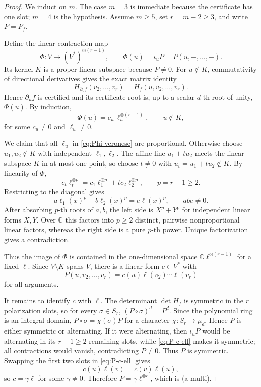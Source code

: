 \documentclass[11pt]{amsart}
\newcommand{\C}{\mathbb C}
\begin{document}
\begin{proof}
We induct on $m$.  The case $m=3$ is immediate because the certificate has one
slot; $m=4$ is the hypothesis.  Assume $m\ge5$, set $r=m-2\ge3$, and write
$P=P_f$.

Define the linear contraction map
\[
 \Phi:V\longrightarrow(V^*)^{\otimes(r-1)},\qquad
 \Phi(u)=\iota_uP=P(u,-,\ldots,-).
\]
Its kernel $K$ is a proper linear subspace because $P\neq0$.  For
$u\notin K$, commutativity of directional derivatives gives the exact matrix
identity
\[
 H_{\partial_u f}(v_2,\ldots,v_r)=H_f(u,v_2,\ldots,v_r).
\]
Hence $\partial_u f$ is certified and its certificate root is, up to a scalar
$d$-th root of unity, $\Phi(u)$.  By induction,
\begin{equation}\label{eq:Phi-veronese}
 \Phi(u)=c_u\,\ell_u^{\otimes(r-1)},\qquad u\notin K,
\end{equation}
for some $c_u\neq0$ and $\ell_u\neq0$.

We claim that all $\ell_u$ in \eqref{eq:Phi-veronese} are proportional.
Otherwise choose $u_1,u_2\notin K$ with independent $\ell_1,\ell_2$.
The affine line $u_1+t u_2$ meets the linear subspace $K$ in at most one point,
so choose $t\neq0$ with $u_t=u_1+t u_2\notin K$.  By linearity of $\Phi$,
\[
 c_t\ell_t^{\otimes p}
 =c_1\ell_1^{\otimes p}+t c_2\ell_2^{\otimes p},
 \qquad p=r-1\ge2.
\]
Restricting to the diagonal gives
\[
 a\ell_1(x)^p+b\ell_2(x)^p=e\ell(x)^p,
 \qquad abe\neq0.
\]
After absorbing $p$-th roots of $a,b$, the left side is $X^p+Y^p$ for
independent linear forms $X,Y$.  Over $\C$ this factors into $p\ge2$ distinct,
pairwise nonproportional linear factors, whereas the right side is a pure
$p$-th power.  Unique factorization gives a contradiction.

Thus the image of $\Phi$ is contained in the one-dimensional space
$\C\ell^{\otimes(r-1)}$ for a fixed $\ell$.  Since $V\setminus K$ spans $V$,
there is a linear form $c\in V^*$ with
\begin{equation}\label{eq:P-c-ell}
 P(u,v_2,\ldots,v_r)
 =c(u)\ell(v_2)\cdots\ell(v_r)
\end{equation}
for all arguments.

It remains to identify $c$ with $\ell$.  The determinant $\det H_f$ is symmetric
in the $r$ polarization slots, so for every $\sigma\in S_r$,
$(P\circ\sigma)^d=P^d$.  Since the polynomial ring is an integral domain,
$P\circ\sigma=\chi(\sigma)P$ for a character
$\chi:S_r\to\mu_d$.  Hence $P$ is either symmetric or alternating.  If it were
alternating, then $\iota_uP$ would be alternating in its $r-1\ge2$ remaining
slots, while \eqref{eq:P-c-ell} makes it symmetric; all contractions would
vanish, contradicting $P\neq0$.  Thus $P$ is symmetric.  Swapping the first two
slots in \eqref{eq:P-c-ell} gives
\[
 c(u)\ell(v)=c(v)\ell(u),
\]
so $c=\gamma\ell$ for some $\gamma\neq0$.  Therefore
$P=\gamma\ell^{\otimes r}$, which is (a-multi).
\end{proof}
\end{document}
